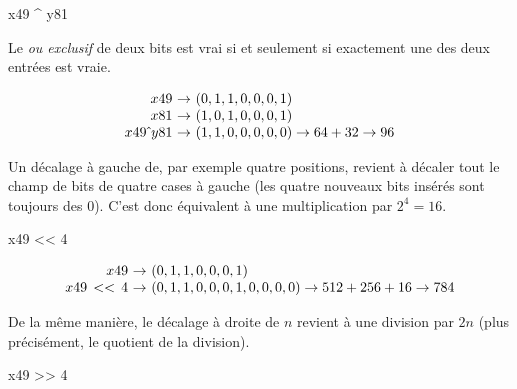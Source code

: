 \begin{idleconsole}
	\begin{pyconsole}
		x49 ^ y81
	\end{pyconsole}
\end{idleconsole}

Le \textit{ou exclusif} de deux bits est vrai si et seulement si exactement une des deux entrées est vraie.

\vspace{-0.75\baselineskip}

\begin{equation}
\begin{array}{r@{~}c@{~}l}
x49 & \rightarrow & (0, 1, 1, 0, 0, 0, 1) \\
x81 & \rightarrow & (1, 0, 1, 0, 0, 0, 1) \\
x49\, \hat{} \, y81 &\rightarrow & (1, 1, 0, 0, 0, 0, 0) \rightarrow 64 + 32 \rightarrow 96
\end{array}
\end{equation}
\vspace{-0.75\baselineskip}


Un décalage à gauche de, par exemple quatre positions, revient à décaler tout le champ de bits de quatre cases à gauche (les quatre nouveaux bits insérés sont toujours des 0). C'est donc équivalent à une multiplication par $2^4 = 16$.

\begin{idleconsole}
	\begin{pyconsole}
		x49 << 4
	\end{pyconsole}
\end{idleconsole}


\begin{equation}
\begin{array}{r@{~}c@{~}l}
x49 & \rightarrow & (0, 1, 1, 0, 0, 0, 1) \\
x49\, << \, 4 &\rightarrow & (0, 1, 1, 0, 0, 0, 1, 0, 0, 0, 0) \rightarrow 512 + 256 + 16 \rightarrow 784
\end{array}
\end{equation}

De la même manière, le décalage à droite de $n$ revient à une division par $2n$ (plus précisément, le quotient de la division).

\begin{idleconsole}
	\begin{pyconsole}
		x49 >> 4
	\end{pyconsole}
\end{idleconsole}

